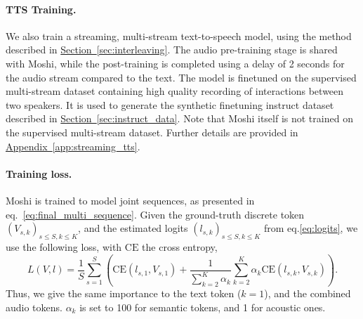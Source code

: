 \paragraph{TTS Training.}

We also train a streaming, multi-stream text-to-speech model, using the method described in \hyperref[sec:interleaving]{Section~\ref{sec:interleaving}}. The audio pre-training stage is shared with Moshi, while the post-training is completed using a delay of 2 seconds for the audio stream compared to the text. The model is finetuned on the supervised multi-stream dataset containing high quality recording of interactions between two speakers. It is used to generate the synthetic finetuning instruct dataset described in \hyperref[sec:instruct_data]{Section~\ref{sec:instruct_data}}. Note that Moshi itself is not trained on the supervised multi-stream dataset. Further details are provided in \hyperref[app:streaming_tts]{Appendix~\ref{app:streaming_tts}}.

\paragraph{Training loss.}
Moshi is trained to model joint sequences, as presented in eq.~\ref{eq:final_multi_sequence}. Given the ground-truth discrete token $(V_{s, k})_{s\leq S, k\leq K}$, 
and the estimated logits $(l_{s, k})_{s\leq S, k\leq K}$ from eq.\ref{eq:logits}, we use the following loss, with $\mathrm{CE}$ the cross entropy,
\begin{equation}
L(V, l) = \frac{1}{S}\sum_{s=1}^S\left(\mathrm{CE}(l_{s, 1}, V_{s, 1}) + \frac{1}{\sum_{k=2}^K \alpha_k}\sum_{k=2}^K \alpha_k \mathrm{CE}(l_{s, k}, V_{s, k})\right).
\end{equation}
Thus, we give the same importance to the text token ($k{=}1$), and the combined audio tokens. $\alpha_k$ is set to 100 for semantic tokens, and 1 for acoustic ones.
